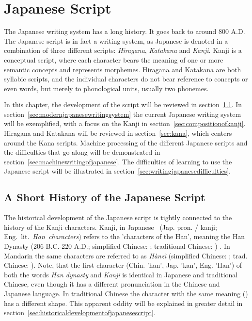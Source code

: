 
\chapter{Japanese Script}
\label{sec:japansescript}

The Japanese writing system has a long history. It goes back to around 800 A.D. 
The Japanese script is in fact a writing system, as Japanese is denoted in 
a combination of three different scripts: \emph{Hiragana}, \emph{Katakana} and 
\emph{Kanji}. Kanji is a conceptual script, where each character bears the 
meaning of one or more semantic concepts and represents morphemes. 
Hiragana and Katakana are both syllabic scripts, and the individual characters do
not bear reference to concepts or even words, but merely to phonological units, 
usually two phonemes.

In this chapter, the development of the script will be reviewed in 
section~\ref{sec:ashorthistoryofjapanesewritingsystem}.
In section~\ref{sec:modernjapanesewritingsystem} the current Japanese writing 
system will be exemplified, with a focus on the Kanji in 
section~\ref{sec:compositionofkanji}. Hiragana and Katakana will be reviewed in
section~\ref{sec:kana}, which centers around the Kana scripts. 
Machine processing of the different Japanese scripts and the difficulties that
go along will be demonstrated in section~\ref{sec:machinewritingofjapanese}.
The difficulties of learning to use the Japanese script will be illustrated in 
section~\ref{sec:writingjapanesedifficulties}.

\section{A Short History of the Japanese Script}
\label{sec:ashorthistoryofjapanesewritingsystem}

The historical development of the Japanese script is tightly connected to the 
history of the Kanji characters. Kanji, in Japanese 
~(Jap. pron.  / kanji; Eng.~lit.~\emph{Han~characters}) 
refers to the 'characters of the Han', meaning the Han Dynasty 
(206 B.C.-220 A.D.; simplified Chinese: ; traditional Chinese: 
) . In Mandarin the same characters are 
referred to as \emph{Hànzì} (simplified Chinese: ; 
trad. Chinese: ).
Note, that the first character  (Chin. 'han', Jap. 'kan', Eng. 'Han') 
of both the words \emph{Han dynasty} and \emph{Kanji} is identical in Japanese 
and traditional Chinese, even though it has a different pronunciation in the 
Chinese and Japanese language. In traditional Chinese the character with
the same meaning () has a different shape. This apparent oddity will be 
explained in greater detail in 
section~\ref{sec:historicaldevelopmentofjapanesescript}.

